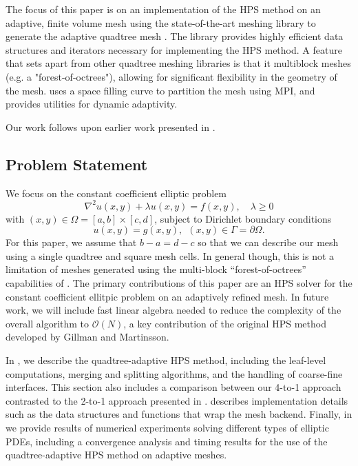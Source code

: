 The focus of this paper is on an implementation of the HPS method on an adaptive, finite volume mesh using the state-of-the-art meshing library \pforest to generate the adaptive quadtree mesh \citep{burstedde2011p4est}.  The \pforest library provides highly efficient data structures and iterators necessary for implementing the HPS method.  A feature that sets \pforest apart from other quadtree meshing libraries is that it multiblock meshes (e.g. a "forest-of-octrees"), allowing for significant flexibility in the geometry of the mesh. \pforest uses a space filling curve to partition the mesh using MPI, and provides utilities for dynamic adaptivity.   Our work follows upon earlier work presented in \citep{babb2018accelerated, geldermans2019adaptive}.


\subsection{Problem Statement}

We focus on the constant coefficient elliptic problem
\begin{equation}
    \nabla^2 u(x,y) + \lambda u(x,y) = f(x,y), \quad \lambda \ge 0
    \label{eq:elliptic_pde}
\end{equation}
with $(x,y) \in \Omega = [a, b] \times [c,d]$, subject to Dirichlet boundary conditions
\begin{equation}
    u(x,y) = g(x,y),\ \ (x,y) \in \Gamma = \partial \Omega.
\end{equation}
For this paper, we assume that $b-a=d-c$ so that we can describe our mesh using a single quadtree and square mesh cells.  In general though, this is not a limitation of meshes generated using the multi-block ``forest-of-octrees'' capabilities of \pforest.  The primary contributions of this paper are an HPS solver for the constant coefficient ellitpic problem on an adaptively refined \pforest mesh. In future work, we will include fast linear algebra needed to reduce the complexity of the overall algorithm to $\mathcal O(N)$, a key contribution of the original HPS method developed by Gillman and Martinsson.

In , we describe the quadtree-adaptive HPS method, including the leaf-level computations, merging and splitting algorithms, and the handling of coarse-fine interfaces. This section also includes a comparison between our 4-to-1 approach contrasted to the 2-to-1 approach presented in \citep{gillman2014direct}.  describes implementation details such as the data structures and functions that wrap the \pforest mesh backend. Finally, in  we provide results of numerical experiments solving different types of elliptic PDEs, including a convergence analysis and timing results for the use of the quadtree-adaptive HPS method on adaptive meshes.